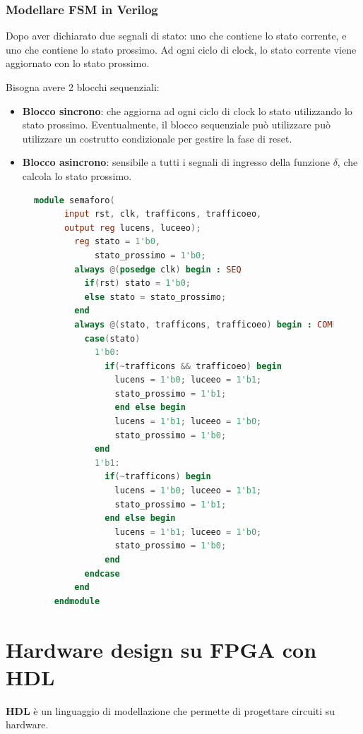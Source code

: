\documentclass[a4paper]{article}
\theoremstyle{break}
\theoremstyle{break}
\theoremstyle{break}
\theoremstyle{break}
\begin{document}
\subsubsection{Modellare FSM in Verilog}
Dopo aver dichiarato due segnali di stato: uno che contiene lo stato
corrente, e uno che contiene lo stato prossimo. Ad ogni ciclo di clock, lo
stato corrente viene aggiornato con lo stato prossimo.

Bisogna avere 2 blocchi sequenziali:
\begin{itemize}
  \item \textbf{Blocco sincrono}: che aggiorna ad ogni ciclo di clock lo stato utilizzando
    lo stato prossimo. Eventualmente, il blocco sequenziale può utilizzare può utilizzare un
    costrutto condizionale per gestire la fase di reset.
  \item \textbf{Blocco asincrono}: sensibile a tutti i segnali di ingresso della funzione \( \delta \),
    che calcola lo stato prossimo.
\end{itemize}

\begin{figure}[H]
  \begin{lstlisting}[language=Verilog]
    module semaforo(
      input rst, clk, trafficons, trafficoeo,
      output reg lucens, luceeo);
        reg stato = 1'b0,
            stato_prossimo = 1'b0;
        always @(posedge clk) begin : SEQ
          if(rst) stato = 1'b0;
          else stato = stato_prossimo;
        end
        always @(stato, trafficons, trafficoeo) begin : COMB_OUT
          case(stato)
            1'b0:
              if(~trafficons && trafficoeo) begin
                lucens = 1'b0; luceeo = 1'b1;
                stato_prossimo = 1'b1;
                end else begin
                lucens = 1'b1; luceeo = 1'b0;
                stato_prossimo = 1'b0;
            end
            1'b1:
              if(~trafficons) begin
                lucens = 1'b0; luceeo = 1'b1;
                stato_prossimo = 1'b1;
              end else begin
                lucens = 1'b1; luceeo = 1'b0;
                stato_prossimo = 1'b0;
              end
          endcase
        end
    endmodule
  \end{lstlisting}
\end{figure}

\section{Hardware design su FPGA con HDL}
\textbf{HDL} è un linguaggio di modellazione che permette di progettare circuiti su hardware.
\end{document}
